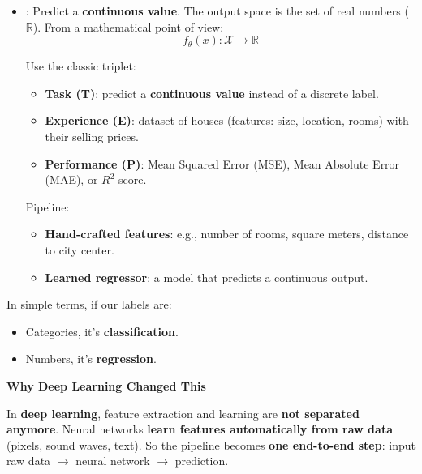 \begin{itemize}
    \item {}: Predict a \textbf{continuous value}. The output space is the set of real numbers ($\mathbb{R}$). From a mathematical point of view:
    \begin{equation*}
        f_\theta(x) : \mathcal{X} \to \mathbb{R}
    \end{equation*}
    \begin{examplebox}
        Use the classic triplet:
        \begin{itemize}
            \item \textbf{Task (T)}: predict a \textbf{continuous value} instead of a discrete label.
            \item \textbf{Experience (E)}: dataset of houses (features: size, location, rooms) with their selling prices.
            \item \textbf{Performance (P)}: Mean Squared Error (MSE), Mean Absolute Error (MAE), or $R^{2}$ score.
        \end{itemize}
        Pipeline:
        \begin{itemize}
            \item \textbf{Hand-crafted features}: e.g., number of rooms, square meters, distance to city center.
            \item \textbf{Learned regressor}: a model that predicts a continuous output.
        \end{itemize}
    \end{examplebox}
\end{itemize}
In simple terms, if our labels are:
\begin{itemize}
    \item Categories, it's \textbf{classification}.
    \item Numbers, it's \textbf{regression}.
\end{itemize}

\highspace
\begin{flushleft}
    \textcolor{Green3}{ \textbf{Why Deep Learning Changed This}}
\end{flushleft}
In \textbf{deep learning}, feature extraction and learning are \textbf{not separated anymore}. Neural networks \textbf{learn features automatically from raw data} (pixels, sound waves, text). So the pipeline becomes \textbf{one end-to-end step}: input raw data $\to$ neural network $\to$ prediction.

\highspace
{}
